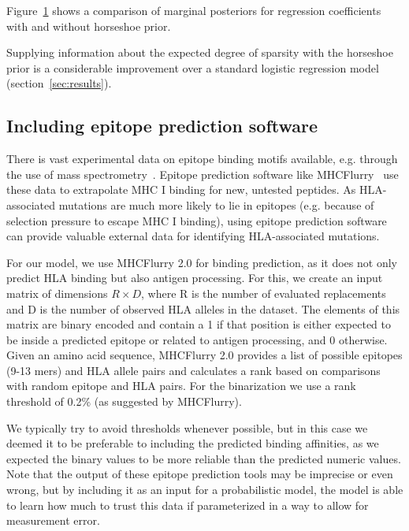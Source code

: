 \documentclass[fleqn,11pt]{SelfArx} %
\begin{document}
Figure~\ref{fig:horseshoe-comparison} shows a comparison of marginal posteriors for regression coefficients with and without horseshoe prior.

Supplying information about the expected degree of sparsity with the horseshoe prior is a considerable improvement over a standard logistic regression model  (section~\ref{sec:results}).

\begin{figure}
  \label{fig:horseshoe-comparison}
\end{figure}

\subsection*{Including epitope prediction software}

There is vast experimental data on epitope binding motifs available, e.g. through the use of mass spectrometry~\cite{Hunt1992}. Epitope prediction software like MHCFlurry~\cite{ODonnell2020} use these data to extrapolate MHC I binding for new, untested peptides.
As HLA-associated mutations are much more likely to lie in epitopes (e.g. because of selection pressure to escape MHC I binding), using epitope prediction software can provide valuable external data for identifying HLA-associated mutations.

For our model, we use MHCFlurry 2.0 for binding prediction, as it does not only predict HLA binding but also antigen processing. For this, we create an input matrix of dimensions \(R\times D\), where R is the number of evaluated replacements and D is the number of observed HLA alleles in the dataset. The elements of this matrix are binary encoded and contain a 1 if that position is either expected to be inside a predicted epitope or related to antigen processing, and 0 otherwise. Given an amino acid sequence, MHCFlurry 2.0 provides a list of possible epitopes (9-13 mers) and HLA allele pairs and calculates a rank based on comparisons with random epitope and HLA pairs. For the binarization we use a rank threshold of 0.2\% (as suggested by MHCFlurry).

We typically try to avoid thresholds whenever possible, but in this case we deemed it to be preferable to including the predicted binding affinities, as we expected the binary values to be more reliable than the predicted numeric values.
Note that the output of these epitope prediction tools may be imprecise or even wrong, but by including it as an input for a probabilistic model, the model is able to learn how much to trust this data if parameterized in a way to allow for measurement error.
\end{document}

